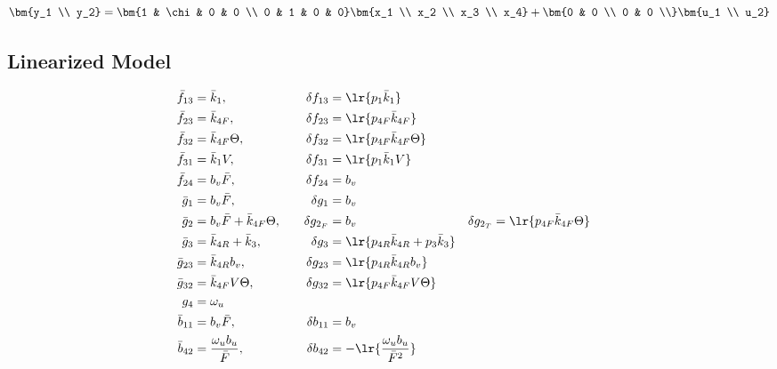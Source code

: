 \begin{equation}\label{eqn::ctrl_out}
    \bm{y_1 \\ y_2} = \bm{1 & \chi & 0 & 0 \\
                                 0 & 1       & 0 & 0}
                            \bm{x_1 \\ x_2 \\ x_3 \\ x_4} +
                            \bm{0 & 0 \\
                                0 & 0 \\}
                            \bm{u_1 \\ u_2}
\end{equation}


\subsection{Linearized Model \label{eqn::lin_model}}
\begin{align*}
     \bar f_{13} &= \bar k_{1}, \quad&
    \delta f_{13} &= \lr{ p_{1} \bar k_{1} } \\
     \bar f_{23} &= \bar k_{4F}, \quad &
    \delta f_{23}  &= \lr{ p_{4F} \bar k_{4F} } \\
     \bar f_{32} &= \bar k_{4F} \Theta, \quad &
    \delta f_{32}  &= \lr{ p_{4F}  \bar k_{4F} \Theta }
    \\
     \bar f_{31} &= \bar k_1 V, \quad &
    \delta f_{31}  &= \lr{ p_1 \bar k_1 V }
    \\
     \bar f_{24} &= b_v \bar F,
    \quad &
    \delta f_{24}  &= b_v
    \\
     \bar g_1 &= b_v \bar F,
    \quad &
    \delta g_1  &= b_v
    \\
    \bar g_2 &= b_v \bar F + \bar k_{4F} \Theta,
    \quad &
    \delta g_{2_F}  &= b_v
    \quad &
    \delta g_{2_T} &= \lr{ p_{4F}  \bar k_{4F}  \Theta }
    \\
    \bar g_3 &= \bar k_{4R} + \bar k_3,
    \quad &
    \delta g_3 &= \lr{ p_{4R} \bar k_{4R} + p_3 \bar k_3}
    \\
    \bar g_{23} &= \bar k_{4R} b_v,
    \quad &
    \delta g_{23}  &= \lr{ p_{4R} \bar k_{4R} b_v }
    \\
    \bar g_{32} &= \bar k_{4F} V \Theta,
    \quad &
    \delta g_{32}  &= \lr{ p_{4F} \bar k_{4F} V \Theta }
    \\
    g_4 &= \omega_u
    \\
    \bar b_{11} &= b_v \bar F,
    \quad &
    \delta b_{11} &= b_v
    \\
    \bar b_{42} &= \frac{\omega_u b_u}{\bar F},
    \quad &
    \delta b_{42}  &= -\lr{\frac{\omega_u b_u}{\bar F^2}}
\end{align*}


